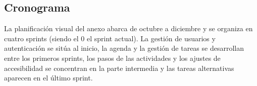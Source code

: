 \subsection{Cronograma}
La planificación visual del anexo abarca de octubre a diciembre y se organiza en cuatro sprints (siendo el 0 el sprint actual). La gestión de usuarios y autenticación se sitúa al inicio, la agenda y la gestión de tareas se desarrollan entre los primeros sprints, los pasos de las actividades y los ajustes de accesibilidad se concentran en la parte intermedia y las tareas alternativas aparecen en el último sprint.